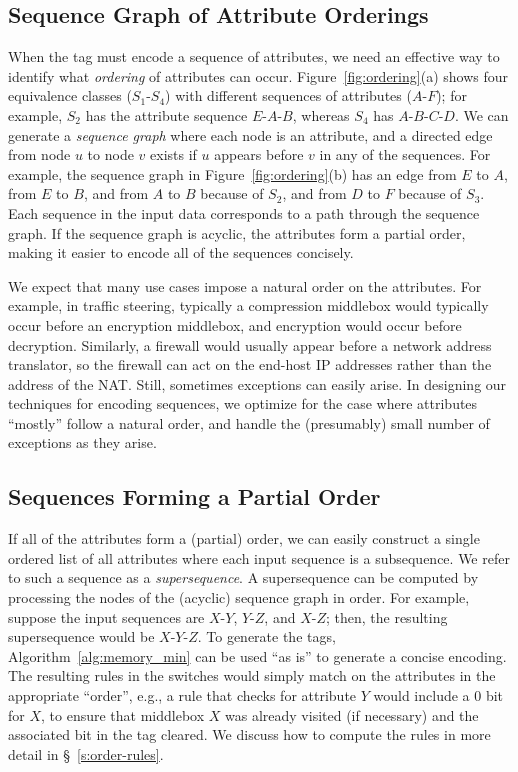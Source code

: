 \subsection{Sequence Graph of Attribute Orderings}
When the tag must encode a sequence of attributes, we need an effective way to identify what \emph{ordering} of attributes can occur.  Figure~\ref{fig:ordering}(a) shows four equivalence classes ($S_1$-$S_4$) with different sequences of attributes ($A$-$F$); for example, $S_2$ has the attribute sequence $E$-$A$-$B$, whereas $S_4$ has $A$-$B$-$C$-$D$.  We can generate a \emph{sequence graph} where each node is an attribute, and a directed edge from node $u$ to node $v$ exists if $u$ appears before $v$ in any of the sequences.  For example, the sequence graph in Figure~\ref{fig:ordering}(b) has an edge from $E$ to $A$, 
from $E$ to $B$, and from $A$ to $B$ because of $S_2$, and from $D$ to $F$ because of $S_3$.  Each sequence in the input data corresponds to a path through the sequence graph.  If the sequence graph is acyclic, the attributes form a partial order, making it easier to encode all of the sequences concisely.

We expect that many use cases impose a natural order on the attributes.  For example, in traffic steering, typically a compression middlebox would typically occur before an encryption middlebox, and encryption would occur before decryption.  Similarly, a firewall would usually appear before a network address translator, so the firewall can act on the end-host IP addresses rather than the address of the NAT.  Still, sometimes exceptions can easily arise.  In designing our techniques for encoding sequences, we optimize for the case where attributes ``mostly'' follow a natural order, and handle the (presumably) small number of exceptions as they arise.

\subsection{Sequences Forming a Partial Order}
If all of the attributes form a (partial) order, we can easily construct a single ordered list of all attributes where each input sequence is a subsequence. We refer to such a sequence as a \emph{supersequence}.  A supersequence can be computed by processing the nodes of the (acyclic) sequence graph in order. For example, suppose the input sequences are $X$-$Y$, $Y$-$Z$, and $X$-$Z$; then, the resulting supersequence would be $X$-$Y$-$Z$. To generate the tags, Algorithm~\ref{alg:memory_min} can be used ``as is'' to generate a concise encoding.  The resulting rules in the switches would simply match on the attributes in the appropriate ``order'', e.g., a rule that checks for attribute $Y$ would include a $0$ bit for $X$, to ensure that middlebox $X$ was already visited (if necessary) and the associated bit in the tag cleared.  We discuss how to compute the rules in more detail in \S~\ref{s:order-rules}.

